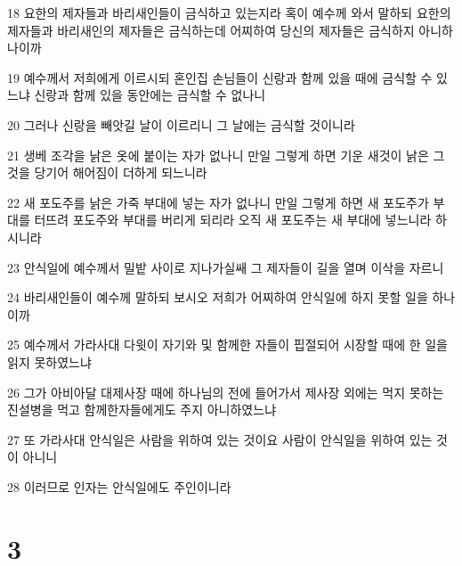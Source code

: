 \par 18 요한의 제자들과 바리새인들이 금식하고 있는지라 혹이 예수께 와서 말하되 요한의 제자들과 바리새인의 제자들은 금식하는데 어찌하여 당신의 제자들은 금식하지 아니하나이까
\par 19 예수께서 저희에게 이르시되 혼인집 손님들이 신랑과 함께 있을 때에 금식할 수 있느냐 신랑과 함께 있을 동안에는 금식할 수 없나니
\par 20 그러나 신랑을 빼앗길 날이 이르리니 그 날에는 금식할 것이니라
\par 21 생베 조각을 낡은 옷에 붙이는 자가 없나니 만일 그렇게 하면 기운 새것이 낡은 그것을 당기어 해어짐이 더하게 되느니라
\par 22 새 포도주를 낡은 가죽 부대에 넣는 자가 없나니 만일 그렇게 하면 새 포도주가 부대를 터뜨려 포도주와 부대를 버리게 되리라 오직 새 포도주는 새 부대에 넣느니라 하시니라
\par 23 안식일에 예수께서 밀밭 사이로 지나가실쌔 그 제자들이 길을 열며 이삭을 자르니
\par 24 바리새인들이 예수께 말하되 보시오 저희가 어찌하여 안식일에 하지 못할 일을 하나이까
\par 25 예수께서 가라사대 다윗이 자기와 및 함께한 자들이 핍절되어 시장할 때에 한 일을 읽지 못하였느냐
\par 26 그가 아비아달 대제사장 때에 하나님의 전에 들어가서 제사장 외에는 먹지 못하는 진설병을 먹고 함께한자들에게도 주지 아니하였느냐
\par 27 또 가라사대 안식일은 사람을 위하여 있는 것이요 사람이 안식일을 위하여 있는 것이 아니니
\par 28 이러므로 인자는 안식일에도 주인이니라

\chapter{3}

